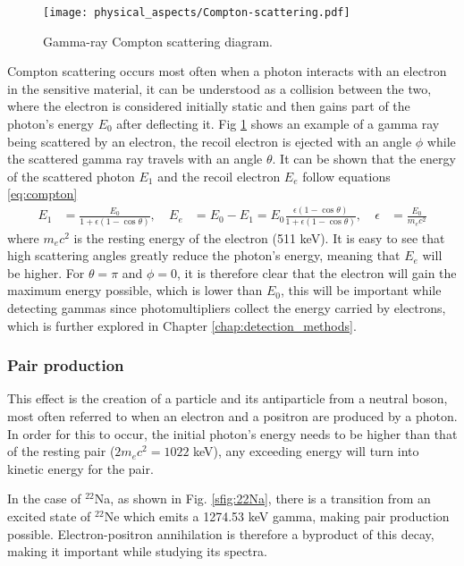 \begin{figure}[H]
  \centering
  \texttt{[image: physical\_aspects/Compton-scattering.pdf]}
  \caption{\label{fig:Compton_scattering_diagram}Gamma-ray Compton scattering diagram.}
\end{figure}

Compton scattering occurs most often when a photon interacts with an electron in the sensitive material, it can be understood as a collision between the two, where the electron is considered initially static and then gains part of the photon's energy $E_0$ after deflecting it. Fig \ref{fig:Compton_scattering_diagram} shows an example of a gamma ray being scattered by an electron, the recoil electron is ejected with an angle $\phi$ while the scattered gamma ray travels with an angle $\theta$. It can be shown that the energy of the scattered photon $E_{1}$ and the recoil electron $E_e$ follow equations \eqref{eq:compton}
\begin{align}
  E_{1} &= \frac{E_0}{1+\epsilon(1-\cos\theta)} \label{eq:compton},~ & E_e &= E_0 - E_1 = E_0\frac{\epsilon(1-\cos\theta)}{1+\epsilon(1-\cos\theta)},~ & \epsilon&=\frac{E_0}{m_{e}c^2} 
\end{align}
where $m_e c^2$ is the resting energy of the electron (511 \unit{\kilo\eV}). It is easy to see that high scattering angles greatly reduce the photon's energy, meaning that $E_e$ will be higher. For $\theta=\pi$ and $\phi=0$, it is therefore clear that the electron will gain the maximum energy possible, which is lower than $E_0$, this will be important while detecting gammas since photomultipliers collect the energy carried by electrons, which is further explored in Chapter \ref{chap:detection_methods}.

\subsubsection{Pair production}

This effect is the creation of a particle and its antiparticle from a neutral boson, most often referred to when an electron and a positron are produced by a photon. In order for this to occur, the initial photon's energy needs to be higher than that of the resting pair ($2m_e c^2=1022$ \unit{\kilo\eV}), any exceeding energy will turn into kinetic energy for the pair.

In the case of $^{22}$Na, as shown in Fig. \ref{sfig:22Na}, there is a transition from an excited state of $^{22}$Ne which emits a 1274.53 \unit{\kilo\eV} gamma, making pair production possible. Electron-positron annihilation is therefore a byproduct of this decay, making it important while studying its spectra.

